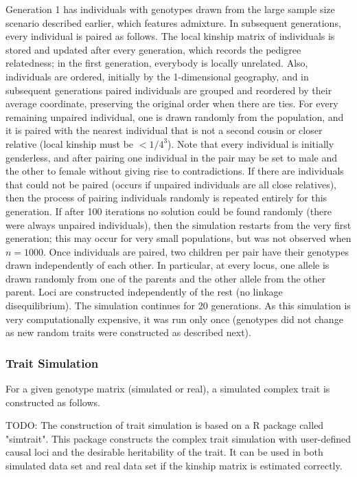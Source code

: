 \documentclass[12pt]{article}
\begin{document}
Generation 1 has individuals with genotypes drawn from the large sample size scenario described earlier, which features admixture.
In subsequent generations, every individual is paired as follows.
The local kinship matrix of individuals is stored and updated after every generation, which records the pedigree relatedness; in the first generation, everybody is locally unrelated.
Also, individuals are ordered, initially by the 1-dimensional geography, and in subsequent generations paired individuals are grouped and reordered by their average coordinate, preserving the original order when there are ties.
For every remaining unpaired individual, one is drawn randomly from the population, and it is paired with the nearest individual that is not a second cousin or closer relative (local kinship must be $< 1/4^3$).
Note that every individual is initially genderless, and after pairing one individual in the pair may be set to male and the other to female without giving rise to contradictions.
If there are individuals that could not be paired (occurs if unpaired individuals are all close relatives), then the process of pairing individuals randomly is repeated entirely for this generation.
If after 100 iterations no solution could be found randomly (there were always unpaired individuals), then the simulation restarts from the very first generation; this may occur for very small populations, but was not observed when $n = 1000$.
Once individuals are paired, two children per pair have their genotypes drawn independently of each other.
In particular, at every locus, one allele is drawn randomly from one of the parents and the other allele from the other parent.
Loci are constructed independently of the rest (no linkage disequilibrium).
The simulation continues for 20 generations.
As this simulation is very computationally expensive, it was run only once (genotypes did not change as new random traits were constructed as described next).

\subsubsection{Trait Simulation}

For a given genotype matrix (simulated or real), a simulated complex trait is constructed as follows.


TODO:
The construction of trait simulation is based on a R package called "simtrait".
This package constructs the complex trait simulation with user-defined causal loci and the desirable heritability of the trait.
It can be used in both simulated data set and real data set if the kinship matrix is estimated correctly.
\end{document}
